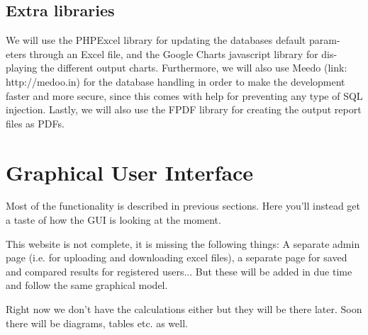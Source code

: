 \documentclass[]{article}
\begin{document}
\subsection{Extra libraries}
We will use the PHPExcel library for updating the databases default param-
eters through an Excel file, and the Google Charts javascript library for dis-
playing the different output charts. Furthermore, we will also use Meedo (link:
http://medoo.in) for the database handling in order to make the development
faster and more secure, since this comes with help for preventing any type of
SQL injection. Lastly, we will also use the FPDF library for creating the output report files as PDFs.

\section{Graphical User Interface}
Most of the functionality is described in previous sections. Here you'll instead get a taste of how the GUI is looking at the moment.

This website is not complete, it is missing the following things: A separate admin page (i.e. for uploading and downloading excel files), a separate page for saved and compared results for registered users... But these will be added in due time and follow the same graphical model.

Right now we don't have the calculations either but they will be there later. Soon there will be diagrams, tables etc. as well.
\end{document}
